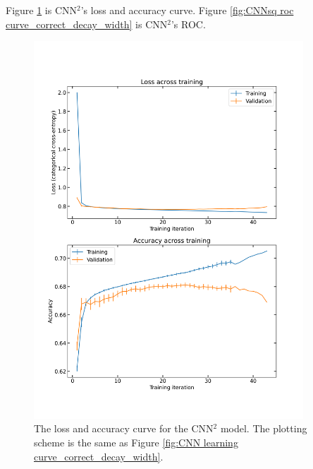 \documentclass[12pt]{article}
\begin{document}
		Figure \ref{fig:CNNsq learning curve_correct_decay_width} is CNN${}^2$'s loss and accuracy curve. Figure \ref{fig:CNNsq roc curve_correct_decay_width} is CNN${}^2$'s ROC.
		\begin{figure}[htpb]
			\centering
			\includegraphics[width=0.90\textwidth]{CNNsq_loss_and_accuracy_correct_width.png}
			\caption{The loss and accuracy curve for the CNN$^2$ model. The plotting scheme is the same as Figure \ref{fig:CNN learning curve_correct_decay_width}.}
			\label{fig:CNNsq learning curve_correct_decay_width}
		\end{figure}
\end{document}
